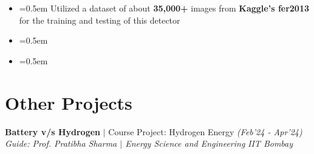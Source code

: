 \documentclass{article}
\begin{document}
\begin{itemize}[label=\textcolor{myblue}{\textbullet},itemsep = -1.25mm, leftmargin=5.5mm]
\vspace{-5pt}
\item{}\font=0.5em Utilized a dataset of about \textbf{35,000+} images from \textbf{Kaggle’s fer2013} for the training and testing of this detector
\item{}\font=0.5em 
\item{}\font=0.5em 

\end{itemize}
\vspace{-20pt}
\section*{\LARGE \textbf{Other Projects}}
\vspace{-12pt}
\hline
\vspace{6pt}

{\fontsize{12}{12} \textbf{Battery v/s Hydrogen} $|$ Course Project: Hydrogen Energy}  \hfill{\sl \small (Feb’24 - Apr’24)}\\
{\it Guide: Prof. Pratibha Sharma $|$ Energy Science and Engineering} \hfill{\it IIT Bombay}\hspace{-2pt}
 
\end{document}
